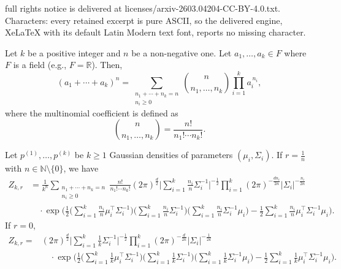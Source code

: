 \documentclass[10pt,a4paper]{amsart}
\newcommand{\N}{\mathbb{N}}
\newcommand{\R}{\mathbb{R}}
\begin{document}
full rights notice is delivered at licenses/arxiv-2603.04204-CC-BY-4.0.txt. Characters: every retained excerpt is pure ASCII, so the delivered engine, XeLaTeX with its default Latin Modern text font, reports no missing character.
\begin{lemma}\label{lemma: multinomial}
Let $k$ be a positive integer and $n$ be a non-negative one. 
Let $a_1,\dots,a_k \in F$ where $F$ is a field (e.g., $F=\R$). Then,
\begin{equation}\label{eq: multinomial}
(a_1 + \cdots + a_k)^n
=
\sum_{\substack{n_1+\cdots+n_k=n \\ n_i \ge 0}}
\binom{n}{n_1,\dots,n_k}
\prod_{i=1}^{k} a_i^{\,n_i},
\end{equation}
where the multinomial coefficient is defined as
\begin{equation}
\binom{n}{n_1,\dots,n_k}
=
\frac{n!}{n_1!\cdots n_k!}.
\end{equation}
\end{lemma}

\begin{proposition}\label{proposition: z for 1 over n} Let $p^{(1)},\dots,p^{(k)}$ be $k \geq 1$ Gaussian densities of parameters $(\mu_i,\Sigma_i)$. If $r = \frac{1}{n}$ with $n \in \N \setminus \{0\}$, we have
\begin{equation}
\begin{aligned}
Z_{k,r}
&= \frac{1}{k^n}\sum_{\substack{n_1+\cdots+n_k=n \\ n_i \ge 0}} 
\frac{n!}{n_1!\cdots n_k!}
(2 \pi)^{\frac{d}{2}}
\Big| \sum_{i=1}^k \frac{n_i}{n} \Sigma_i^{-1} \Big|^{-\frac{1}{2}}
\prod_{i=1}^k (2\pi)^{-\frac{d n_i}{2n}}
| \Sigma_i |^{-\frac{n_i}{2n}} \\
&\quad \cdot
\exp\Bigg(
\frac{1}{2}
\Big(\sum_{i=1}^k \frac{n_i}{n} \mu_i^\top \Sigma_i^{-1}\Big)
\Big(\sum_{i=1}^k \frac{n_i}{n} \Sigma_i^{-1}\Big)
\Big(\sum_{i=1}^k \frac{n_i}{n} \Sigma_i^{-1} \mu_i\Big)
-\frac{1}{2}
\sum_{i=1}^k \frac{n_i}{n} \mu_i^\top \Sigma_i^{-1} \mu_i
\Bigg).
\end{aligned}
\end{equation}
If $r=0$, 
\begin{equation}
\begin{aligned}
Z_{k,r} = & (2 \pi)^{\frac{d}{2}}
\Big| \sum_{i=1}^k \frac{1}{k} \Sigma_i^{-1} \Big|^{-\frac{1}{2}}
\prod_{i=1}^k (2\pi)^{-\frac{d}{2k}}
| \Sigma_i |^{-\frac{1}{2k}} \\
&\quad \cdot \exp\Bigg(
\frac{1}{2}
\Big(\sum_{i=1}^k \frac{1}{k} \mu_i^\top \Sigma_i^{-1}\Big)
\Big(\sum_{i=1}^k \frac{1}{k} \Sigma_i^{-1}\Big)
\Big(\sum_{i=1}^k \frac{1}{k} \Sigma_i^{-1} \mu_i\Big)
-\frac{1}{2}
\sum_{i=1}^k \frac{1}{k} \mu_i^\top \Sigma_i^{-1} \mu_i
\Bigg).
\end{aligned}
\end{equation}

\end{proposition}
\end{document}
